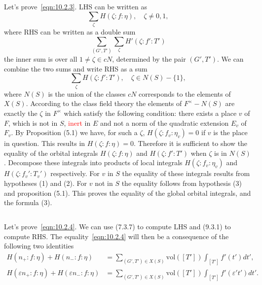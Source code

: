 \subsection{}
Let's prove~\eqref{eqn:10.2.3}.
LHS can be written as
\begin{equation*}
    \sum_{\zeta} H(\zeta:f:\eta), \quad \zeta \neq 0, 1,
\end{equation*}
where RHS can be written as a double sum
\begin{equation*}
    \sum_{(G', T')}\sum_{\zeta}H'(\zeta:f':T')
\end{equation*}
the inner sum is over all $1 \neq \zeta \in cN$, determined by the pair $(G', T')$.
We can combine the two sums and write RHS as a sum
\begin{equation*}
    \sum_{\zeta} H(\zeta:f':T'), \quad \zeta \in N(S) - \{1\},
\end{equation*}
where $N(S)$ is the union of the classes $cN$ corresponds to  the elements of $X(S)$.
According to the class field theory the elements of $F^\times - N(S)$ are exactly the $\zeta$ in $F^\times$ which satisfy the following condition: there exists a place $v$ of $F$, which is not in $S$, \textcolor{red}{inert} in $E$ and not a norm of the quadratic extension $E_v$ of $F_v$.
By Proposition (5.1) we have, for such a $\zeta$, $H(\zeta:f_v:\eta_v)=0$ if $v$ is the place in question.
This results in $H(\zeta:f:\eta)=0$.
Therefore it is sufficient to show the equality of the orbital integrals $H(\zeta:f:\eta)$ and $H(\zeta:f':T')$ when $\zeta$ is in $N(S)$.
Decompose these integrals into products of local integrals $H(\zeta:f_v:\eta_v)$ and $H(\zeta:f_v':T_v')$ respectively.
For $v$ in $S$ the equality of these integrals results from hypotheses (1) and (2).
For $v$ not in $S$ the equality follows from hypothesis (3) and proposition (5.1).
This proves the equality of the global orbital integrals, and the formula (3).


\subsection{}
Let's prove~\eqref{eqn:10.2.4}.
We can use (7.3.7) to compute LHS and (9.3.1) to compute RHS.
The equality~\eqref{eqn:10.2.4} will then be a consequence of the following two identities
\begin{align}
    H(n_+: f: \eta) + H(n_-:f:\eta) &= \sum_{(G',T') \in X(S)} \mathrm{vol}([T']) \int_{[T']} f'(t')dt', \label{eqn:10.4.1}\\
    H(\varepsilon n_+: f:\eta) + H(\varepsilon n_-:f:\eta) &= \sum_{(G',T')\in X(S)} \mathrm{vol}([T']) \int_{[T']} f'(\varepsilon't')dt'.
\end{align}

